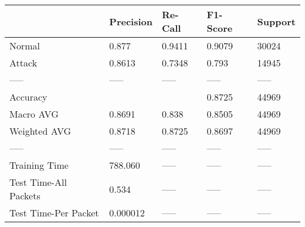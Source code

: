 \begin{tabular}{lllll}
\toprule
{} & Precision & Re-Call & F1-Score & Support \\
\midrule
Normal                &     0.877 &  0.9411 &   0.9079 &   30024 \\
Attack                &    0.8613 &  0.7348 &    0.793 &   14945 \\
-----                 &     ----- &   ----- &    ----- &   ----- \\
Accuracy              &           &         &   0.8725 &   44969 \\
Macro AVG             &    0.8691 &   0.838 &   0.8505 &   44969 \\
Weighted AVG          &    0.8718 &  0.8725 &   0.8697 &   44969 \\
-----                 &     ----- &   ----- &    ----- &   ----- \\
Training Time         &   788.060 &   ----- &    ----- &   ----- \\
Test Time-All Packets &     0.534 &   ----- &    ----- &   ----- \\
Test Time-Per Packet  &  0.000012 &   ----- &    ----- &   ----- \\
\bottomrule
\end{tabular}
